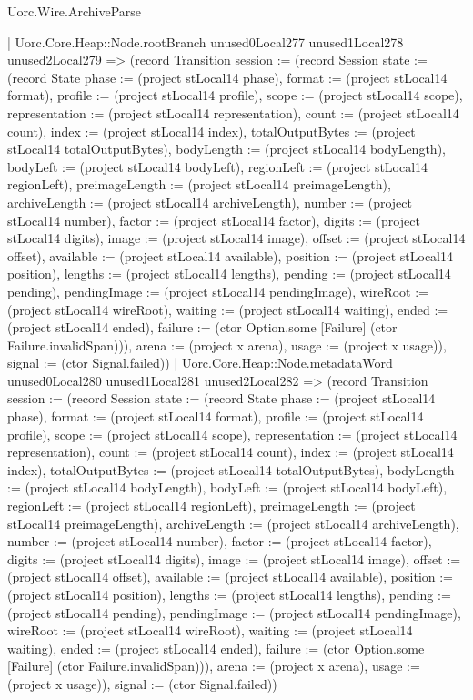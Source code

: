 \begin{lexlean}{Uorc.Wire.ArchiveParse}
\begin{semanticmodule}
{            | Uorc.Core.Heap::Node.rootBranch unused0Local277 unused1Local278 unused2Local279 => (record Transition {session := (record Session {state := (record State {phase := (project stLocal14 phase), format := (project stLocal14 format), profile := (project stLocal14 profile), scope := (project stLocal14 scope), representation := (project stLocal14 representation), count := (project stLocal14 count), index := (project stLocal14 index), totalOutputBytes := (project stLocal14 totalOutputBytes), bodyLength := (project stLocal14 bodyLength), bodyLeft := (project stLocal14 bodyLeft), regionLeft := (project stLocal14 regionLeft), preimageLength := (project stLocal14 preimageLength), archiveLength := (project stLocal14 archiveLength), number := (project stLocal14 number), factor := (project stLocal14 factor), digits := (project stLocal14 digits), image := (project stLocal14 image), offset := (project stLocal14 offset), available := (project stLocal14 available), position := (project stLocal14 position), lengths := (project stLocal14 lengths), pending := (project stLocal14 pending), pendingImage := (project stLocal14 pendingImage), wireRoot := (project stLocal14 wireRoot), waiting := (project stLocal14 waiting), ended := (project stLocal14 ended), failure := (ctor Option.some [Failure] (ctor Failure.invalidSpan))}), arena := (project x arena), usage := (project x usage)}), signal := (ctor Signal.failed)})
            | Uorc.Core.Heap::Node.metadataWord unused0Local280 unused1Local281 unused2Local282 => (record Transition {session := (record Session {state := (record State {phase := (project stLocal14 phase), format := (project stLocal14 format), profile := (project stLocal14 profile), scope := (project stLocal14 scope), representation := (project stLocal14 representation), count := (project stLocal14 count), index := (project stLocal14 index), totalOutputBytes := (project stLocal14 totalOutputBytes), bodyLength := (project stLocal14 bodyLength), bodyLeft := (project stLocal14 bodyLeft), regionLeft := (project stLocal14 regionLeft), preimageLength := (project stLocal14 preimageLength), archiveLength := (project stLocal14 archiveLength), number := (project stLocal14 number), factor := (project stLocal14 factor), digits := (project stLocal14 digits), image := (project stLocal14 image), offset := (project stLocal14 offset), available := (project stLocal14 available), position := (project stLocal14 position), lengths := (project stLocal14 lengths), pending := (project stLocal14 pending), pendingImage := (project stLocal14 pendingImage), wireRoot := (project stLocal14 wireRoot), waiting := (project stLocal14 waiting), ended := (project stLocal14 ended), failure := (ctor Option.some [Failure] (ctor Failure.invalidSpan))}), arena := (project x arena), usage := (project x usage)}), signal := (ctor Signal.failed)})
}
\end{semanticmodule}
\end{lexlean}
